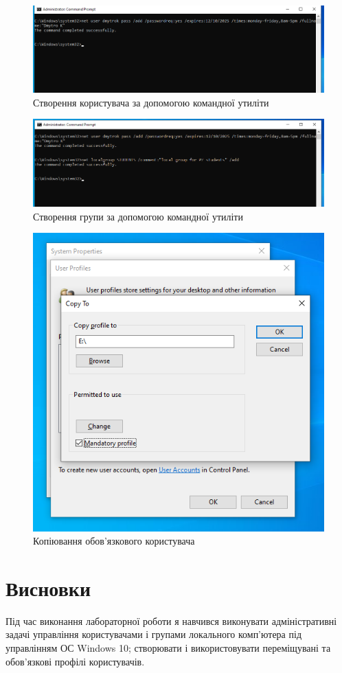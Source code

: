 \documentclass[oneside,14pt]{extarticle}
\begin{document}
\begin{normalsize}
	\begin{figure}[H]
		\centering
		\includegraphics[scale=0.6]{6}
		\caption{Створення користувача за допомогою командної утиліти}
	\end{figure}
	
	\begin{figure}[H]
		\centering
		\includegraphics[scale=0.6]{7}
		\caption{Створення групи за допомогою командної утиліти}
	\end{figure}
	
	\begin{figure}[H]
		\centering
		\includegraphics[scale=0.6]{8}
		\caption{Копіювання обов'язкового користувача}
	\end{figure}
	
	\section*{Висновки}
	Під час виконання лабораторної роботи я навчився виконувати адміністративні задачі управління
	користувачами і групами локального комп’ютера під управлінням ОС Windows
	10; створювати і використовувати переміщувані та обов’язкові профілі
	користувачів.
		    
\end{normalsize}
\end{document}
